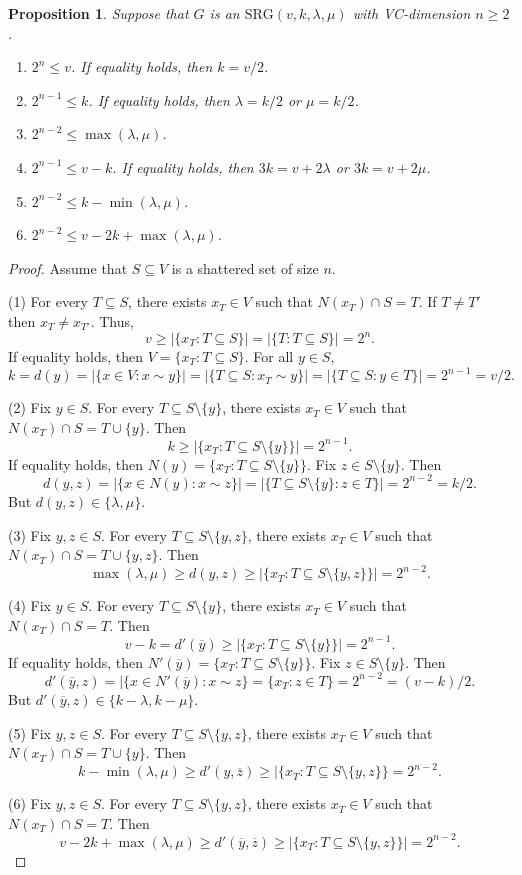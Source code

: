 \documentclass{article}
\newcommand\sm{\setminus}
\newtheorem{prop}[thm]{Proposition}
\theoremstyle{definition}
\begin{document}
\begin{prop} \label{Proposition misc bounds}
    Suppose that $G$ is an $\mathrm{SRG}(v,k,\lambda,\mu)$ with VC-dimension $n\ge 2$.
    \begin{enumerate}
        \item $2^n\le v$. If equality holds, then $k=v/2$.
        \item $2^{n-1}\le k$. If equality holds, then $\lambda=k/2$ or $\mu=k/2$.
        \item $2^{n-2}\le\max(\lambda,\mu)$.
        \item $2^{n-1}\le v-k$. If equality holds, then $3k=v+2\lambda$ or $3k=v+2\mu$.
        \item $2^{n-2}\le k-\min(\lambda,\mu)$.
        \item $2^{n-2}\le v-2k+\max(\lambda,\mu)$.
    \end{enumerate}
\end{prop}
\begin{proof}
    Assume that $S\subseteq V$ is a shattered set of size $n$.

    (1) For every $T\subseteq S$, there exists $x_T\in V$ such that $N(x_T)\cap S=T$. If $T\ne T'$ then $x_{T}\ne x_{T'}$. Thus,
    $$v\ge |\{x_T:T\subseteq S\}|=|\{T:T\subseteq S\}|=2^n.$$
    If equality holds, then $V=\{x_T:T\subseteq S\}$. For all $y\in S$,
    $$k=d(y)=|\{x\in V:x\sim y\}|=|\{T\subseteq S:x_T\sim y\}|=|\{T\subseteq S:y\in T\}|=2^{n-1}=v/2.$$

    (2) Fix $y\in S$. For every $T\subseteq S\sm\{y\}$, there exists $x_T\in V$ such that $N(x_T)\cap S=T\cup\{y\}$. Then
    $$k\ge|\{x_T:T\subseteq S\sm\{y\}\}|=2^{n-1}.$$
    If equality holds, then $N(y)=\{x_T:T\subseteq S\sm\{y\}\}$. Fix $z\in S\sm\{y\}$. Then
    $$d(y,z)=|\{x\in N(y):x\sim z\}|=|\{T\subseteq S\sm\{y\}:z\in T\}|=2^{n-2}=k/2.$$
    But $d(y,z)\in\{\lambda,\mu\}$.

    (3) Fix $y,z\in S$. For every $T\subseteq S\sm\{y,z\}$, there exists $x_T\in V$ such that $N(x_T)\cap S=T\cup\{y,z\}$. Then
    $$\max(\lambda,\mu)\ge d(y,z)
    \ge|\{x_T:T\subseteq S\sm\{y,z\}\}|=2^{n-2}.$$

    (4) Fix $y\in S$. For every $T\subseteq S\sm\{y\}$, there exists $x_T\in V$ such that $N(x_T)\cap S=T$. Then
    $$v-k=d'(\overline y)\ge|\{x_T:T\subseteq S\sm\{y\}\}|=2^{n-1}.$$
    If equality holds, then $N'(\overline y)=\{x_T:T\subseteq S\sm\{y\}\}$. Fix $z\in S\sm\{y\}$. Then
    $$d'(\overline y,z)=|\{x\in N'(\overline y):x\sim z
    \}=\{x_T:z\in T\}=2^{n-2}=(v-k)/2.$$
    But $d'(\overline y,z)\in\{k-\lambda,k-\mu\}.$

    (5) Fix $y,z\in S$. For every $T\subseteq S\sm\{y,z\}$, there exists $x_T\in V$ such that $N(x_T)\cap S=T\cup\{y\}$. Then
    $$k-\min(\lambda,\mu)\ge d'(y,\overline z)\ge|\{x_T:T\subseteq S\sm\{y,z\}\}=2^{n-2}.$$

    (6) Fix $y,z\in S$. For every $T\subseteq S\sm\{y,z\}$, there exists $x_T\in V$ such that $N(x_T)\cap S=T$. Then
    $$v-2k+\max(\lambda,\mu)\ge d'(\overline y,\overline z)\ge|\{x_T:T\subseteq S\sm\{y,z\}\}|=2^{n-2}.$$
\end{proof}
\end{document}
